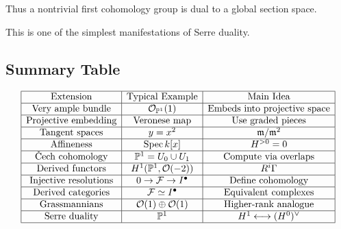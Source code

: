 \documentclass[12pt,a4paper]{article}
\theoremstyle{notespace}
\begin{document}
Thus a nontrivial first cohomology group is dual to a global section space.

This is one of the simplest manifestations of Serre duality.

\subsection{Summary Table}

\[
\begin{array}{|c|c|c|}
	\hline
	\text{Extension} &
	\text{Typical Example} &
	\text{Main Idea}
	\\
	\hline
	\text{Very ample bundle}
	&
	\mathcal O_{\mathbb P^1}(1)
	&
	\text{Embeds into projective space}
	\\
	\hline
	\text{Projective embedding}
	&
	\text{Veronese map}
	&
	\text{Use graded pieces}
	\\
	\hline
	\text{Tangent spaces}
	&
	y=x^2
	&
	\mathfrak m/\mathfrak m^2
	\\
	\hline
	\text{Affineness}
	&
	\operatorname{Spec}k[x]
	&
	H^{>0}=0
	\\
	\hline
	\text{\v{C}ech cohomology}
	&
	\mathbb P^1=U_0\cup U_1
	&
	\text{Compute via overlaps}
	\\
	\hline
	\text{Derived functors}
	&
	H^1(\mathbb P^1,\mathcal O(-2))
	&
	R^i\Gamma
	\\
	\hline
	\text{Injective resolutions}
	&
	0\to\mathcal F\to I^\bullet
	&
	\text{Define cohomology}
	\\
	\hline
	\text{Derived categories}
	&
	\mathcal F\simeq I^\bullet
	&
	\text{Equivalent complexes}
	\\
	\hline
	\text{Grassmannians}
	&
	\mathcal O(1)\oplus\mathcal O(1)
	&
	\text{Higher-rank analogue}
	\\
	\hline
	\text{Serre duality}


&
\mathbb{P}^{1}
&
H^{1}\longleftrightarrow (H^{0})^{\vee}
\\
\hline
\end{array}
\]
\end{document}
